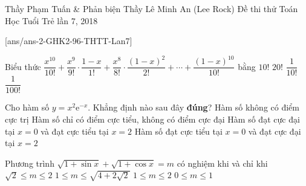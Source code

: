 \begin{name}
{Thầy Phạm Tuấn \& Phản biện Thầy Lê Minh An (Lee Rock)}
{Đề thi thử Toán Học Tuổi Trẻ  lần 7, 2018}
\end{name}
\setcounter{ex}{0}
[ans/ans-2-GHK2-96-THTT-Lan7]

\begin{ex}%
Biểu thức $\dfrac{x^{10}}{10!} + \dfrac{x^9}{9!} \cdot \dfrac{1-x}{1!} + \dfrac{x^8}{8!} \cdot \dfrac{(1-x)^2}{2!}  + \cdots +\dfrac{(1-x)^{10}}{10!}$ bằng
\choice
{$10!$}
{$20!$}
{\True $\dfrac{1}{10!}$}
{$\dfrac{1}{100!}$}
\end{ex}

\begin{ex}%
Cho hàm số $y=x^2\mathrm{e}^{-x}$. Khẳng định nào sau đây \textbf{đúng}?
\choice
{Hàm số không có điểm cực trị}
{Hàm số chỉ có điểm cực tiểu, không có điểm cực đại}
{Hàm số đạt cực đại tại $x=0$ và đạt cực tiểu tại $x=2$}
{\True Hàm số đạt cực tiểu tại $x=0$ và đạt cực đại tại $x=2$}
\end{ex}

\begin{ex}%
Phương trình $\sqrt{1+\sin x} +\sqrt{1+\cos x} =m$ có nghiệm khi và chỉ khi
\choice
{$\sqrt{2} \leq m \leq 2$}
{\True $1 \leq m \leq \sqrt{4+2\sqrt{2}}$}
{$1 \leq m \leq 2$}
{$0 \leq m \leq 1$}
\end{ex}

